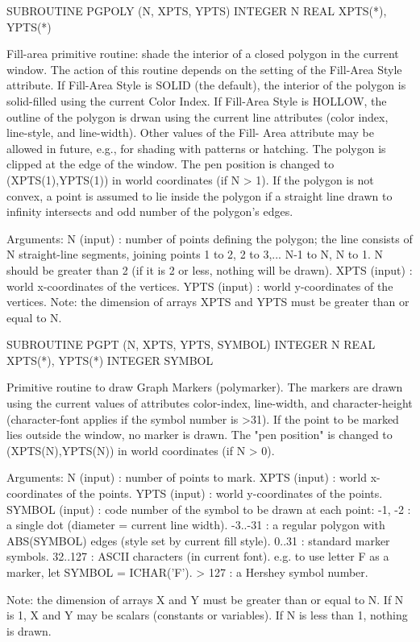 {\eightpoint\begintt
      SUBROUTINE PGPOLY (N, XPTS, YPTS)
      INTEGER N
      REAL XPTS(*), YPTS(*)
 
Fill-area primitive routine: shade the interior of a closed
polygon in the current window.  The action of this routine depends
on the setting of the Fill-Area Style attribute. If Fill-Area Style
is SOLID (the default), the interior of the polygon is solid-filled
using the current Color Index. If Fill-Area Style is HOLLOW, the
outline of the polygon is drwan using the current line attributes
(color index, line-style, and line-width). Other values of the Fill-
Area attribute may be allowed in future, e.g., for shading with
patterns or hatching. The polygon is clipped at the edge of the
window. The pen position is changed to (XPTS(1),YPTS(1)) in world
coordinates (if N > 1).  If the polygon is not convex, a point is
assumed to lie inside the polygon if a straight line drawn to
infinity intersects and odd number of the polygon's edges.
 
Arguments:
 N      (input)  : number of points defining the polygon; the
                   line consists of N straight-line segments,
                   joining points 1 to 2, 2 to 3,... N-1 to N, N to 1.
                   N should be greater than 2 (if it is 2 or less,
                   nothing will be drawn).
 XPTS   (input)  : world x-coordinates of the vertices.
 YPTS   (input)  : world y-coordinates of the vertices.
                   Note: the dimension of arrays XPTS and YPTS must be
                   greater than or equal to N.
\endtt}

{\eightpoint\begintt
      SUBROUTINE PGPT (N, XPTS, YPTS, SYMBOL)
      INTEGER N
      REAL XPTS(*), YPTS(*)
      INTEGER SYMBOL
 
Primitive routine to draw Graph Markers (polymarker). The markers
are drawn using the current values of attributes color-index,
line-width, and character-height (character-font applies if the symbol
number is >31).  If the point to be marked lies outside the window,
no marker is drawn.  The "pen position" is changed to
(XPTS(N),YPTS(N)) in world coordinates (if N > 0).
 
Arguments:
 N      (input)  : number of points to mark.
 XPTS   (input)  : world x-coordinates of the points.
 YPTS   (input)  : world y-coordinates of the points.
 SYMBOL (input)  : code number of the symbol to be drawn at each 
                   point:
                   -1, -2  : a single dot (diameter = current
                             line width).
                   -3..-31 : a regular polygon with ABS(SYMBOL)
                             edges (style set by current fill style).
                   0..31   : standard marker symbols.
                   32..127 : ASCII characters (in current font).
                             e.g. to use letter F as a marker, let
                             SYMBOL = ICHAR('F'). 
                   > 127  :  a Hershey symbol number.
 
Note: the dimension of arrays X and Y must be greater than or equal
to N. If N is 1, X and Y may be scalars (constants or variables). If
N is less than 1, nothing is drawn.
\endtt}

